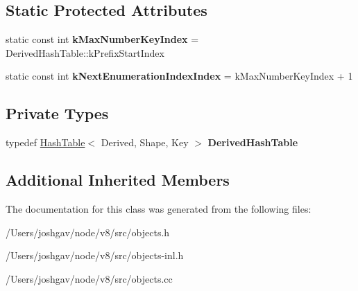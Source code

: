 \subsection*{Static Protected Attributes}
\begin{DoxyCompactItemize}
\item 
static const int {\bfseries k\+Max\+Number\+Key\+Index} = Derived\+Hash\+Table\+::k\+Prefix\+Start\+Index\hypertarget{classv8_1_1internal_1_1_dictionary_a7a69bd868bc49dfac48d810d96477fd0}{}\label{classv8_1_1internal_1_1_dictionary_a7a69bd868bc49dfac48d810d96477fd0}

\item 
static const int {\bfseries k\+Next\+Enumeration\+Index\+Index} = k\+Max\+Number\+Key\+Index + 1\hypertarget{classv8_1_1internal_1_1_dictionary_a533fe267328e05aaa345589cc5ae69eb}{}\label{classv8_1_1internal_1_1_dictionary_a533fe267328e05aaa345589cc5ae69eb}

\end{DoxyCompactItemize}
\subsection*{Private Types}
\begin{DoxyCompactItemize}
\item 
typedef \hyperlink{classv8_1_1internal_1_1_hash_table}{Hash\+Table}$<$ Derived, Shape, Key $>$ {\bfseries Derived\+Hash\+Table}\hypertarget{classv8_1_1internal_1_1_dictionary_a78e6772820ab06a86a4a940e6b1242ee}{}\label{classv8_1_1internal_1_1_dictionary_a78e6772820ab06a86a4a940e6b1242ee}

\end{DoxyCompactItemize}
\subsection*{Additional Inherited Members}


The documentation for this class was generated from the following files\+:\begin{DoxyCompactItemize}
\item 
/\+Users/joshgav/node/v8/src/objects.\+h\item 
/\+Users/joshgav/node/v8/src/objects-\/inl.\+h\item 
/\+Users/joshgav/node/v8/src/objects.\+cc\end{DoxyCompactItemize}
